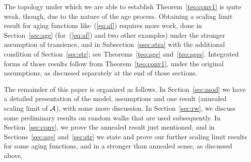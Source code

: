 The topology under which we are able to establish Theorem~\ref{teo:conv1} is
quite weak, though, due to the nature of the age process. Obtaining a scaling limit result for aging functions
like~(\ref{eq:af}) requires more work, done in Section~\ref{sec:age} 
(for~(\ref{eq:af}) and two other examples) under the stronger assumption of transience,
and in Subsection~\ref{ssec:stra} with the additional condition of Section~\ref{sec:str}; see
Theorems~\ref{teo:age} and~\ref{teo:ages}. Integrated forms of those results follow from Theorem~\ref{teo:conv1},
under the original assumptions, as discussed separately at the end of those sections.

The remainder of this paper is organized as follows. In Section~\ref{sec:mod} we have a detailed presentation of the model,
assumptions and one result (annealed scaling limit of ${\cal A}$), with some more discussion. In Section~\ref{sec:rw}, we discuss some preliminary results
on random walks that are used subsequently. In Section~\ref{sec:conv}, we prove the annealed result just mentioned, and in
Sections~\ref{sec:age} and~\ref{sec:str} we state and prove our further scaling limit results for some aging functions, and in a stronger than
annealed sense, as discussed above.
